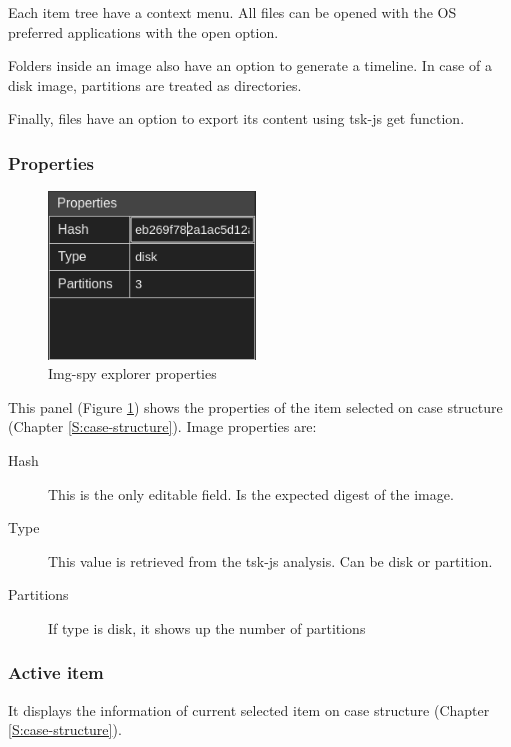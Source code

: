 Each item tree have a context menu. All files can be opened with the OS
preferred applications with the open option.

Folders inside an image also have an option to generate a timeline. In case of
a disk image, partitions are treated as directories.

Finally, files have an option to export its content using tsk-js get function.

\subsubsection{Properties}
\label{S:explorer-properties}

\begin{figure}
	\includegraphics[width=5.5cm]{./figures/explorer-properties.png}
	\centering
	\caption{Img-spy explorer properties}
	\label{F:img-spy-explorer-properties}
\end{figure}

This panel (Figure \ref{F:img-spy-explorer-properties}) shows the properties of
the item selected on case structure (Chapter \ref{S:case-structure}).
Image properties are:

\begin{description}
	\item[Hash] This is the only editable field. Is the expected digest of the 
	image. 

	\item[Type] This value is retrieved from the tsk-js analysis. Can be disk
	or partition.
	
	\item[Partitions] If type is disk, it shows up the number of partitions
\end{description}

\subsubsection{Active item}

It displays the information of current selected item on case structure (Chapter
\ref{S:case-structure}).

